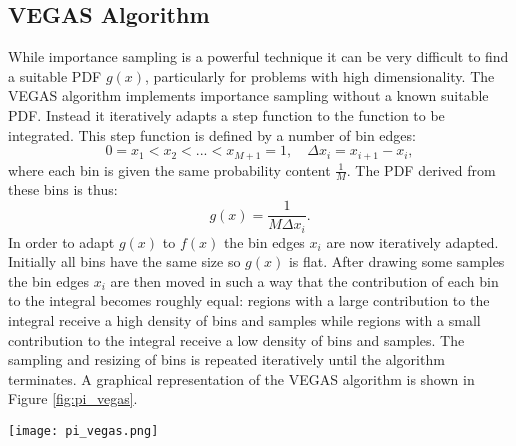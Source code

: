 \subsection{VEGAS Algorithm}
While importance sampling is a powerful technique it can be very difficult to find a suitable PDF $g(x)$,
particularly for problems with high dimensionality.
The VEGAS algorithm implements importance sampling without a known suitable PDF.
Instead it iteratively adapts a step function to the function to be integrated.
This step function is defined by a number of bin edges:
\begin{equation}
	0=x_1<x_2 < ... < x_{M+1}=1, \quad \Delta x_i = x_{i+1} - x_{i},
\end{equation}
where each bin is given the same probability content $\frac{1}{M}$.
The PDF derived from these bins is thus:
\begin{equation}
	g(x) = \frac{1}{M \Delta x_i}.
\end{equation}
In order to adapt $g(x)$ to $f(x)$ the bin edges $x_i$ are now iteratively adapted.
Initially all bins have the same size so $g(x)$ is flat.
After drawing some samples the bin edges $x_i$ are then moved in such a way that the contribution
of each bin to the integral becomes roughly equal:
regions with a large contribution to the integral receive a high density of bins and samples
while regions with a small contribution to the integral receive a low density of bins and samples.
The sampling and resizing of bins is repeated iteratively until the algorithm terminates.
A graphical representation of the VEGAS algorithm is shown in Figure \ref{fig:pi_vegas}.
\begin{figure*}
	\centering
	\texttt{[image: pi\_vegas.png]}
	\caption{
		Visualization of the VEGAS algorithm with 3 iterations.
		The PDF $g(x)$ is initially flat.
		In the second and third iterations the shape of $g(x)$ is much closer shape of $f(x)$.
	}
	\label{fig:pi_vegas}
\end{figure*}
